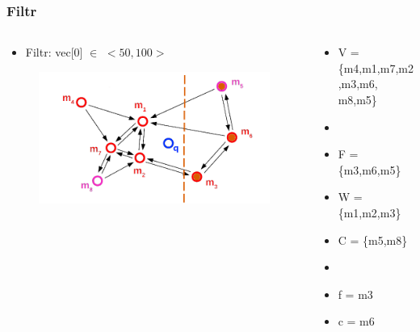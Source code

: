 \documentclass{beamer}
\begin{document}
	\begin{frame}
		\frametitle{Filtr}
		\begin{columns}[T] %
			\begin{column}{.6\textwidth}
				\begin{itemize}
					\item[] Filtr: vec[0] $\in$ $<50,100>$
				\end{itemize}
				\begin{figure}
					\includegraphics[scale=0.3]{figures/Filtry_b5.png}
				\end{figure}
			\end{column}%
			\hfill%
			\begin{column}{.4\textwidth}
				\begin{itemize}
					\item V = \{m4,m1,m7,m2,m3,m6, m8,m5\}
					\item[]
					\item F = \{m3,m6,m5\}
					\item W = \{m1,m2,m3\}
					\item C = \{m5,m8\}
					\item[]
					\item f = m3
					\item c = m6
				\end{itemize}
			\end{column}%
		\end{columns}
	\end{frame}
\end{document}

